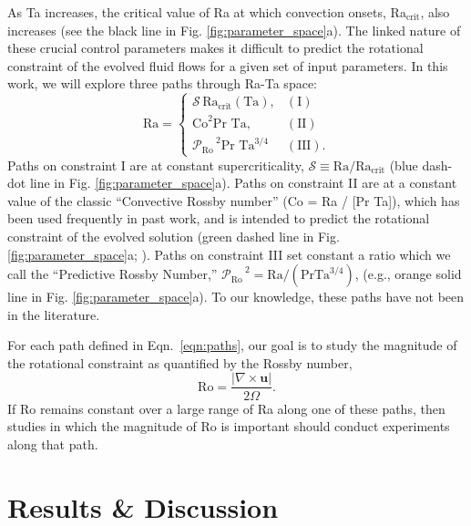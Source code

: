 \documentclass[twocolumn, amsmath, amsfonts, amssymb]{aastex62}
\newcommand{\grad}{\ensuremath{\nabla}}
\newcommand{\pro}{\ensuremath{\mathcal{P}_{\text{Ro}}\,}}
\begin{document}
As Ta increases, the critical value of Ra at which convection onsets,
Ra$_{\text{crit}}$, also increases (see the black line in Fig. \ref{fig:parameter_space}a). 
The linked nature of these crucial
control parameters makes it difficult to predict the rotational constraint of the evolved
fluid flows for a given set of input parameters. In this work, we will
explore three paths through Ra-Ta space:
\begin{equation}
\text{Ra} = 
\begin{cases}
\mathcal{S}\,\text{Ra}_\text{crit}(\text{Ta}), & (\text{I})\\
\text{Co}^2\text{Pr Ta}, & (\text{II}) \\
\pro^2 \text{Pr Ta}^{3/4} & (\text{III}).
\end{cases}
\label{eqn:paths}
\end{equation}
Paths on constraint I are at constant supercriticality, 
$\mathcal{S} \equiv \text{Ra}/\text{Ra}_{\text{crit}}$
(blue dash-dot line in Fig. \ref{fig:parameter_space}a).
Paths on constraint II are at a constant value of the classic
``Convective Rossby number'' (Co = Ra / [Pr Ta]), which has been used frequently 
in past work, and is intended to predict the rotational constraint of the
evolved solution (green dashed line in Fig. \ref{fig:parameter_space}a; 
\citet{julien&all1996, brummell&all1996}). Paths on constraint
III set constant a ratio which we call the ``Predictive Rossby Number,'' 
$\pro^2 = \text{Ra}/(\text{Pr}\text{Ta}^{3/4})$, 
(e.g., orange solid line in Fig. \ref{fig:parameter_space}a).
To our knowledge, these paths have not been
in the literature.

For each path defined in Eqn.~\ref{eqn:paths}, 
our goal is to study the magnitude of the rotational constraint
as quantified by the Rossby number,
\begin{equation}
\text{Ro} = \frac{|\grad\times \bm{u}|}{2 \Omega}.
\label{eqn:ro}
\end{equation}
If Ro remains constant over a large range of Ra along one of these paths,
then studies in which the magnitude of Ro is important should conduct
experiments along that path.



\section{Results \& Discussion}
\end{document}
